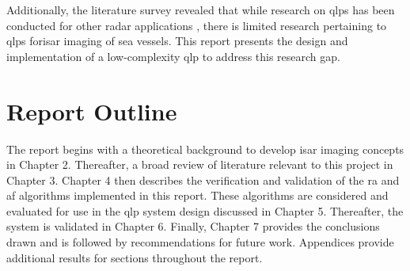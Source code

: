 \documentclass[class=report,11pt,crop=false]{standalone}
\begin{document}
Additionally, the literature survey revealed that while research on \gls{qlp}s has been conducted for other radar applications \cite{quick-look_detection,quick-look_SAR}, there is limited research pertaining to \gls{qlp}s for\gls{isar} imaging of sea vessels. This report presents the design and implementation of a low-complexity \gls{qlp} to address this research gap.

\section{Report Outline}
The report begins with a theoretical background to develop \gls{isar} imaging concepts in Chapter 2. Thereafter, a broad review of literature relevant to this project in Chapter 3. Chapter 4 then describes the verification and validation of the \gls{ra} and \gls{af} algorithms implemented in this report. These algorithms are considered and evaluated for use in the \gls{qlp} system design discussed in Chapter 5. Thereafter, the system is validated in Chapter 6. Finally, Chapter 7 provides the conclusions drawn and is followed by recommendations for future work. Appendices provide additional results for sections throughout the report.
\ifstandalone

\printnoidxglossary[type=\acronymtype,nonumberlist]
\fi
\end{document}
